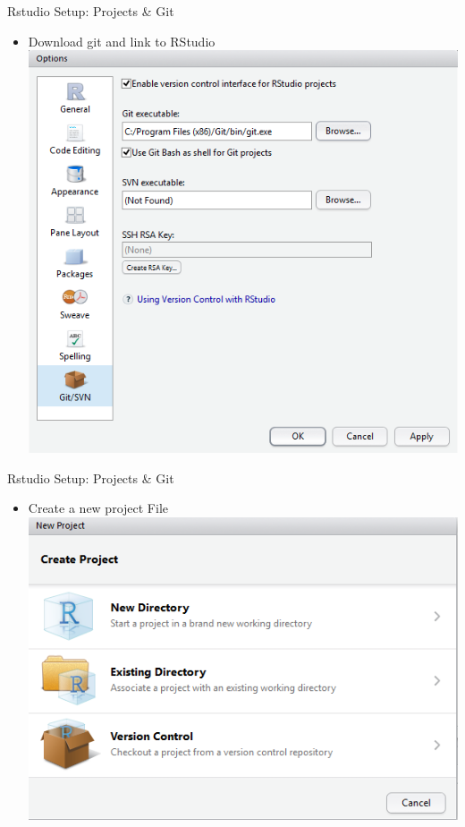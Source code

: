 \documentclass[
  ignorenonframetext,
]{beamer}
\providecommand{\tightlist}{%
  \setlength{\itemsep}{0pt}\setlength{\parskip}{0pt}}
\begin{document}
\begin{frame}{Rstudio Setup: Projects \& Git}
\protect\hypertarget{rstudio-setup-projects-git}{}

\begin{itemize}
\tightlist
\item
  Download git and link to RStudio
  \includegraphics{../external/images/rstudio_setup_git.PNG}
\end{itemize}

\end{frame}

\begin{frame}{Rstudio Setup: Projects \& Git}
\protect\hypertarget{rstudio-setup-projects-git-1}{}

\begin{itemize}
\tightlist
\item
  Create a new project File
  \includegraphics{../external/images/rstudio_setup_project.PNG}
\end{itemize}

\end{frame}
\end{document}

